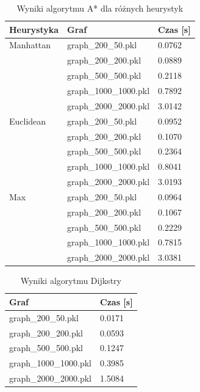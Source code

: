 \documentclass[12pt,twoside]{article}
\begin{document}
\begin{table}[ht]
\caption{Wyniki algorytmu A* dla różnych heurystyk}
\centering		
\begin{tabular}{|p{}|p{}|p{}|}	
\hline
Heurystyka & Graf & Czas [s] \\
\hline
Manhattan & 
graph\_200\_50.pkl & 
0.0762 \\
 & 
graph\_200\_200.pkl & 
0.0889 \\
 & 
graph\_500\_500.pkl & 
0.2118 \\
 & 
graph\_1000\_1000.pkl & 
0.7892 \\
 & 
graph\_2000\_2000.pkl & 
3.0142 \\
\hline
Euclidean & 
graph\_200\_50.pkl & 
0.0952 \\
 & 
graph\_200\_200.pkl & 
0.1070 \\
 & 
graph\_500\_500.pkl & 
0.2364 \\
 & 
graph\_1000\_1000.pkl & 
0.8041 \\
 & 
graph\_2000\_2000.pkl & 
3.0193 \\
\hline
Max & 
graph\_200\_50.pkl & 
0.0964 \\
 & 
graph\_200\_200.pkl & 
0.1067 \\
 & 
graph\_500\_500.pkl & 
0.2229 \\
 & 
graph\_1000\_1000.pkl & 
0.7815 \\
 & 
graph\_2000\_2000.pkl & 
3.0381 \\
\hline
\end{tabular}	

\label{Tab:Astar_results}
\end{table}


\begin{table}[ht]
\caption{Wyniki algorytmu Dijkstry}
\centering		
\begin{tabular}{|p{}|p{}|}	
\hline
Graf & Czas [s] \\
\hline
graph\_200\_50.pkl & 
0.0171 \\
graph\_200\_200.pkl & 
0.0593 \\
graph\_500\_500.pkl & 
0.1247 \\
graph\_1000\_1000.pkl & 
0.3985 \\
graph\_2000\_2000.pkl & 
1.5084 \\
\hline
\end{tabular}	

\label{Tab:Dijkstra_results}
\end{table}
\end{document}
